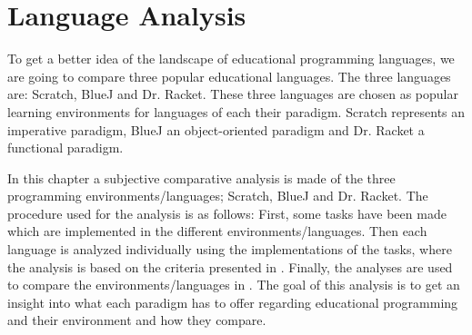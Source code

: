 \chapter{Language Analysis}
\label{chap:language_analysis}
To get a better idea of the landscape of educational programming languages, we are going to compare three popular educational languages.
The three languages are: Scratch, BlueJ and Dr. Racket.
These three languages are chosen as popular learning environments for languages of each their paradigm.
Scratch represents an imperative paradigm, BlueJ an object-oriented paradigm and Dr. Racket a functional paradigm.

In this chapter a subjective comparative analysis is made of the three programming environments/languages; Scratch, BlueJ and Dr. Racket. The procedure used for the analysis is as follows: First, some tasks have been made which are implemented in the different environments/languages. Then each language is analyzed individually using the implementations of the tasks, where the analysis is based on the criteria presented in . Finally, the analyses are used to compare the environments/languages in . The goal of this analysis is to get an insight into what each paradigm has to offer regarding educational programming and their environment and how they compare.

